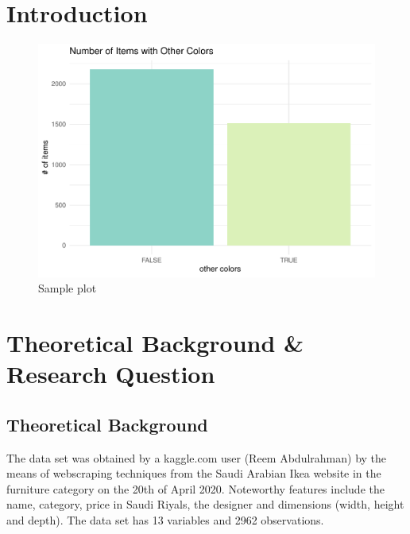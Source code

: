 \documentclass[a4paper, nobind]{templates/ociamthesis}
\begin{document}
\flushbottom

\hypertarget{intro}{%
\chapter{Introduction}\label{intro}}

\begin{figure}
\includegraphics[width=1\linewidth]{_main_files/figure-latex/unnamed-chunk-3-1} \caption{Sample plot}\label{fig:unnamed-chunk-3}
\end{figure}

\hypertarget{theoretical-background-research-question}{%
\chapter{Theoretical Background \& Research Question}\label{theoretical-background-research-question}}

\hypertarget{theoretical_background}{%
\section{Theoretical Background}\label{theoretical_background}}

The data set was obtained by a kaggle.com user (Reem Abdulrahman) by the means of webscraping techniques from the Saudi Arabian Ikea website in the furniture category on the 20th of April 2020. Noteworthy features include the name, category, price in Saudi Riyals, the designer and dimensions (width, height and depth). The data set has 13 variables and 2962 observations.
\end{document}
